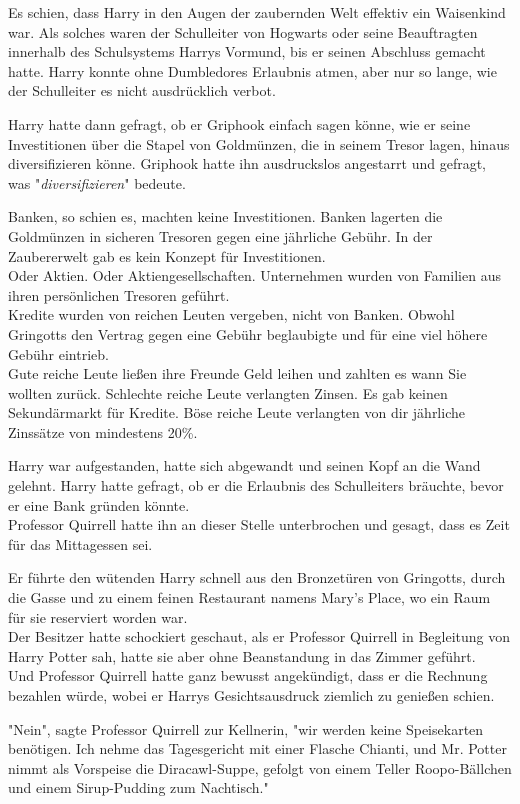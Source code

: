 {Es schien, dass Harry in den Augen der zaubernden Welt effektiv ein Waisenkind war. Als solches waren der Schulleiter von Hogwarts oder seine Beauftragten innerhalb des Schulsystems Harrys Vormund, bis er seinen Abschluss gemacht hatte. Harry konnte ohne Dumbledores Erlaubnis atmen, aber nur so lange, wie der Schulleiter es nicht ausdrücklich verbot.

Harry hatte dann gefragt, ob er Griphook einfach sagen könne, wie er seine Investitionen über die Stapel von Goldmünzen, die in seinem Tresor lagen, hinaus diversifizieren könne. Griphook hatte ihn ausdruckslos angestarrt und gefragt, was "\emph{diversifizieren}" bedeute.

Banken, so schien es, machten keine Investitionen. Banken lagerten die Goldmünzen in sicheren Tresoren gegen eine jährliche Gebühr. In der Zaubererwelt gab es kein Konzept für Investitionen.\\ Oder Aktien. Oder Aktiengesellschaften. Unternehmen wurden von Familien aus ihren persönlichen Tresoren geführt.\\ Kredite wurden von reichen Leuten vergeben, nicht von Banken. Obwohl Gringotts den Vertrag gegen eine Gebühr beglaubigte und für eine viel höhere Gebühr eintrieb.\\ Gute reiche Leute ließen ihre Freunde Geld leihen und zahlten es wann Sie wollten zurück. Schlechte reiche Leute verlangten Zinsen. Es gab keinen Sekundärmarkt für Kredite. Böse reiche Leute verlangten von dir jährliche Zinssätze von mindestens 20\%.

Harry war aufgestanden, hatte sich abgewandt und seinen Kopf an die Wand gelehnt. Harry hatte gefragt, ob er die Erlaubnis des Schulleiters bräuchte, bevor er eine Bank gründen könnte.\\ Professor Quirrell hatte ihn an dieser Stelle unterbrochen und gesagt, dass es Zeit für das Mittagessen sei.

Er führte den wütenden Harry schnell aus den Bronzetüren von Gringotts, durch die Gasse und zu einem feinen Restaurant namens Mary's Place, wo ein Raum für sie reserviert worden war.\\ Der Besitzer hatte schockiert geschaut, als er Professor Quirrell in Begleitung von Harry Potter sah, hatte sie aber ohne Beanstandung in das Zimmer geführt.\\ Und Professor Quirrell hatte ganz bewusst angekündigt, dass er die Rechnung bezahlen würde, wobei er Harrys Gesichtsausdruck ziemlich zu genießen schien.

"Nein", sagte Professor Quirrell zur Kellnerin, "wir werden keine Speisekarten benötigen. Ich nehme das Tagesgericht mit einer Flasche Chianti, und Mr. Potter nimmt als Vorspeise die Diracawl-Suppe, gefolgt von einem Teller Roopo-Bällchen und einem Sirup-Pudding zum Nachtisch."

}
